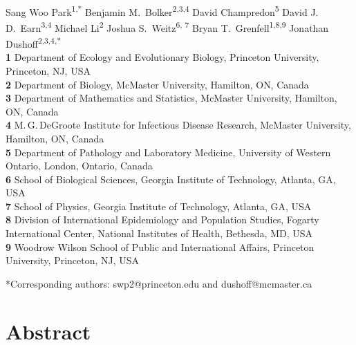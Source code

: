\documentclass[12pt]{article}
\date{\today}
\providecommand{\DIFaddtex}[1]{{\protect\color{blue}\uwave{#1}}} %
\providecommand{\DIFaddbegin}{} %
\providecommand{\DIFadd}[1]{\texorpdfstring{\DIFaddtex{#1}}{#1}} %
\newcommand{\DIFaddincludegraphics}[2][]{{\color{blue}\fbox{\DIFOincludegraphics[#1]{#2}}}} %
\DeclareRobustCommand{\DIFaddbegin}{\DIFOaddbegin \let\includegraphics\DIFaddincludegraphics} %
\begin{document}
\begin{flushleft}{
	\Large
	\textbf{}
}
\newline
\\
Sang Woo Park\textsuperscript{1,*}
Benjamin M.\ Bolker\textsuperscript{2,3,4}
David Champredon\textsuperscript{5}
David J.\,D.\ Earn\textsuperscript{3,4}
Michael Li\textsuperscript{2}
Joshua S.\ Weitz\textsuperscript{6, 7}
Bryan T.\ Grenfell\textsuperscript{1,8,9}
Jonathan Dushoff\textsuperscript{2,3,4,*}
\\
\bigskip
\textbf{1} Department of Ecology and Evolutionary Biology, Princeton University, Princeton, NJ, USA
\\
\textbf{2} Department of Biology, McMaster University, Hamilton, ON, Canada
\\
\textbf{3} Department of Mathematics and Statistics, McMaster University, Hamilton, ON, Canada
\\
\textbf{4} M.\,G.\,DeGroote Institute for Infectious Disease Research, McMaster University, Hamilton, ON, Canada
\\
\textbf{5} Department of Pathology and Laboratory Medicine, University of Western Ontario, London, Ontario, Canada
\\
\textbf{6} School of Biological Sciences, Georgia Institute of Technology, Atlanta, GA, USA
\\
\textbf{7} School of Physics, Georgia Institute of Technology, Atlanta, GA, USA
\\
\textbf{8} Division of International Epidemiology and Population Studies, Fogarty International Center, National Institutes of Health, Bethesda, MD, USA
\\
\textbf{9} Woodrow Wilson School of Public and International Affairs, Princeton University, Princeton, NJ, USA
\\
\bigskip

*Corresponding authors: swp2@princeton.edu and dushoff@mcmaster.ca
\end{flushleft}

\section*{Abstract}
\DIFaddbegin 

\subsection*{\DIFadd{Background}}
\end{document}

